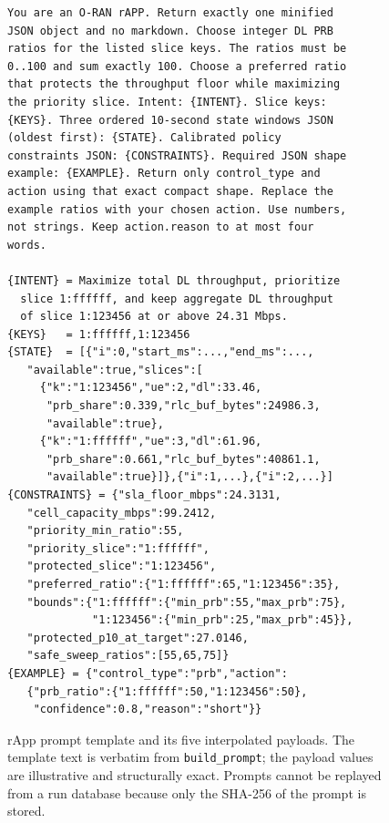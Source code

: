 \begin{figure}[t]
\centering
\scriptsize
\begin{verbatim}
You are an O-RAN rAPP. Return exactly one minified
JSON object and no markdown. Choose integer DL PRB
ratios for the listed slice keys. The ratios must be
0..100 and sum exactly 100. Choose a preferred ratio
that protects the throughput floor while maximizing
the priority slice. Intent: {INTENT}. Slice keys:
{KEYS}. Three ordered 10-second state windows JSON
(oldest first): {STATE}. Calibrated policy
constraints JSON: {CONSTRAINTS}. Required JSON shape
example: {EXAMPLE}. Return only control_type and
action using that exact compact shape. Replace the
example ratios with your chosen action. Use numbers,
not strings. Keep action.reason to at most four
words.

{INTENT} = Maximize total DL throughput, prioritize
  slice 1:ffffff, and keep aggregate DL throughput
  of slice 1:123456 at or above 24.31 Mbps.
{KEYS}   = 1:ffffff,1:123456
{STATE}  = [{"i":0,"start_ms":...,"end_ms":...,
   "available":true,"slices":[
     {"k":"1:123456","ue":2,"dl":33.46,
      "prb_share":0.339,"rlc_buf_bytes":24986.3,
      "available":true},
     {"k":"1:ffffff","ue":3,"dl":61.96,
      "prb_share":0.661,"rlc_buf_bytes":40861.1,
      "available":true}]},{"i":1,...},{"i":2,...}]
{CONSTRAINTS} = {"sla_floor_mbps":24.3131,
   "cell_capacity_mbps":99.2412,
   "priority_min_ratio":55,
   "priority_slice":"1:ffffff",
   "protected_slice":"1:123456",
   "preferred_ratio":{"1:ffffff":65,"1:123456":35},
   "bounds":{"1:ffffff":{"min_prb":55,"max_prb":75},
             "1:123456":{"min_prb":25,"max_prb":45}},
   "protected_p10_at_target":27.0146,
   "safe_sweep_ratios":[55,65,75]}
{EXAMPLE} = {"control_type":"prb","action":
   {"prb_ratio":{"1:ffffff":50,"1:123456":50},
    "confidence":0.8,"reason":"short"}}
\end{verbatim}
\caption{rApp prompt template and its five interpolated payloads. The template text is verbatim from \texttt{build\_prompt}; the payload values are illustrative and structurally exact. Prompts cannot be replayed from a run database because only the SHA-256 of the prompt is stored.}
\label{fig:prompt}
\end{figure}

